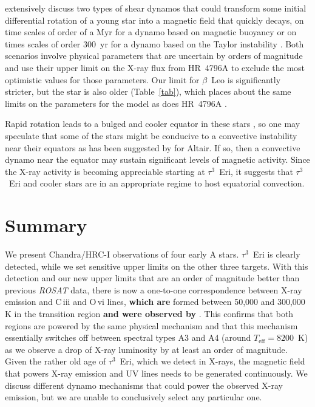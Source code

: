 \documentclass[linenumbers]{aastex631}
\begin{document}
\citet{2014ApJ...786..136D} extensively discuss two types of shear
dynamos that could transform some initial differential rotation of a
young star into a magnetic field that quickly decays, on time scales
of order of a Myr for a dynamo based on magnetic buoyancy
\citep{1995MNRAS.272..528T} or on times scales of order 300~yr for a
dynamo based on the Taylor instability
\citep{2002A&A...381..923S,2006A&A...449..451B}. Both scenarios
involve physical parameters that are uncertain by orders of magnitude
and \citet{2014ApJ...786..136D} use their upper limit on the X-ray
flux from HR~4796A to exclude the most optimistic values for those
parameters. Our limit for $\beta$~Leo is significantly stricter, but
the star is also older (Table~\ref{tab}), which places about the same
limits on the parameters for the \citet{1995MNRAS.272..528T} model as
does HR~4796A \citep[See Fig 3 in][]{2014ApJ...786..136D}.

Rapid rotation leads to a bulged and cooler equator in these stars \citep[on Altair][resolved a temperature difference between pole and equator of at least 1000~K]{2007Sci...317..342M}, so one may speculate that some of the stars might be conducive to a convective instability near their equators as has been suggested by \citet{2009A&A...497..511R} for Altair. If so, then a convective dynamo near the equator may sustain significant levels of magnetic activity. Since the X-ray activity is becoming appreciable starting at $\tau^3$~Eri, it suggests that $\tau^3$~Eri and cooler stars are in an appropriate regime to host equatorial convection. 

\section{Summary}
\label{sec:summary}
We present Chandra/HRC-I observations of four early A stars. $\tau^3$~Eri is clearly detected, while we set sensitive upper limits on the other three targets. With this detection and our new upper limits that are an order of magnitude better than previous \emph{ROSAT} data, there is now a one-to-one correspondence between X-ray emission and C\,{\sc iii} and O\,{\sc vi} lines, \textbf{which are} formed between 50,000 and 300,000 K in the transition region \textbf{and were observed by} \citet{2002ApJ...579..800S}. This confirms that both regions are powered by the same physical mechanism and that this mechanism essentially switches off between spectral types A3 and A4 (around $T_\mathrm{eff}=8200$~K) as we observe a drop of X-ray luminosity by at least an order of magnitude. Given the rather old age of $\tau^3$~Eri, which we detect in X-rays, the magnetic field that powers X-ray emission and UV lines needs to be generated continuously. We discuss different dynamo mechanisms that could power the observed X-ray emission, but we are unable to conclusively select any particular one.
\end{document}

